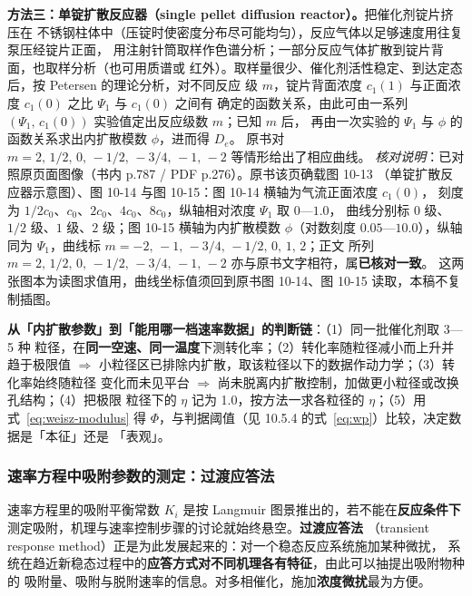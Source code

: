\textbf{方法三：单锭扩散反应器（single pellet diffusion reactor）。}把催化剂锭片挤压在
不锈钢柱体中（压锭时使密度分布尽可能均匀），反应气体以足够速度用往复泵压经锭片正面，
用注射针筒取样作色谱分析；一部分反应气体扩散到锭片背面，也取样分析（也可用质谱或
红外）。取样量很少、催化剂活性稳定、到达定态后，按 Petersen 的理论分析，对不同反应
级 $m$，锭片背面浓度 $c_1(1)$ 与正面浓度 $c_1(0)$ 之比 $\Psi_1$ 与 $c_1(0)$ 之间有
确定的函数关系，由此可由一系列 $(\Psi_1,\,c_1(0))$ 实验值定出反应级数 $m$；已知 $m$ 后，
再由一次实验的 $\Psi_1$ 与 $\phi$ 的函数关系求出内扩散模数 $\phi$，进而得 $D_e$。
原书对 $m=2,\,1/2,\,0,\,-1/2,\,-3/4,\,-1,\,-2$ 等情形给出了相应曲线。
\emph{核对说明}：已对照原页面图像（书内 p.787 / PDF p.276）。原书该页确载图 10-13
（单锭扩散反应器示意图）、图 10-14 与图 10-15：图 10-14 横轴为气流正面浓度 $c_1(0)$，
刻度为 $1/2c_0$、$c_0$、$2c_0$、$4c_0$、$8c_0$，纵轴相对浓度 $\Psi_1$ 取 $0$—$1.0$，
曲线分别标 $0$ 级、$1/2$ 级、$1$ 级、$2$ 级；图 10-15 横轴为内扩散模数 $\phi$（对数刻度
$0.05$—$10.0$），纵轴同为 $\Psi_1$，曲线标 $m=-2,\,-1,\,-3/4,\,-1/2,\,0,\,1,\,2$；正文
所列 $m=2,\,1/2,\,0,\,-1/2,\,-3/4,\,-1,\,-2$ 亦与原书文字相符，属\textbf{已核对一致}。
这两张图本为读图求值用，曲线坐标值须回到原书图 10-14、图 10-15 读取，本稿不复制插图。

\begin{dataflow}
\textbf{从「内扩散参数」到「能用哪一档速率数据」的判断链}：（1）同一批催化剂取 3—5 种
粒径，在\textbf{同一空速、同一温度}下测转化率；（2）转化率随粒径减小而上升并趋于极限值
$\Rightarrow$ 小粒径区已排除内扩散，取该粒径以下的数据作动力学；（3）转化率始终随粒径
变化而未见平台 $\Rightarrow$ 尚未脱离内扩散控制，加做更小粒径或改换孔结构；（4）把极限
粒径下的 $\eta$ 记为 1.0，按方法一求各粒径的 $\eta$；（5）用式~\eqref{eq:weisz-modulus}
得 $\Phi$，与判据阈值（见 10.5.4 的式~\eqref{eq:wp}）比较，决定数据是「本征」还是
「表观」。
\end{dataflow}

\subsubsection{速率方程中吸附参数的测定：过渡应答法}

速率方程里的吸附平衡常数 $K_i$ 是按 Langmuir 图景推出的，若不能在\textbf{反应条件下}
测定吸附，机理与速率控制步骤的讨论就始终悬空。\textbf{过渡应答法}
（transient response method）正是为此发展起来的：对一个稳态反应系统施加某种微扰，
系统在趋近新稳态过程中的\textbf{应答方式对不同机理各有特征}，由此可以抽提出吸附物种的
吸附量、吸附与脱附速率的信息。对多相催化，施加\textbf{浓度微扰}最为方便。


